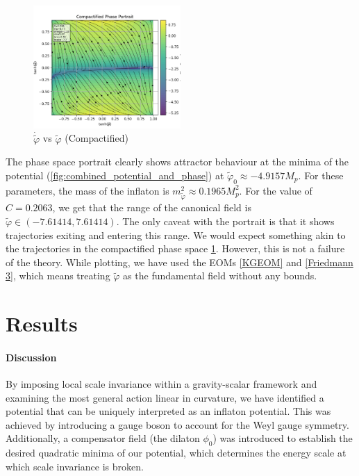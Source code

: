 \documentclass[aps,prd,reprint,preprintnumbers,showpacs,floatfix,nofootinbib,superscript address]{revtex4-2}
\begin{document}
\begin{figure}
    \includegraphics[width=0.5\textwidth]{Python/results/phase_compact.png}
    \caption{$\dot{\tilde{\varphi}}$ vs $\tilde{\varphi}$ (Compactified)}
    \label{Optimized Compact Phase Space potrait1}
\end{figure}


The phase space portrait clearly shows attractor behaviour at the minima of the potential (\cref{fig:combined_potential_and_phase}) at $\tilde{\varphi}_0 \approx -4.9157 M_p$. For these parameters, the mass of the inflaton is $m_{\tilde{\varphi}}^2 \approx  0.1965 M_p^2$. For the value of $C = 0.2063$, we get that the range of the canonical field is $\tilde{\varphi} \in (-7.61414,7.61414)$. The only caveat with the portrait is that it shows trajectories exiting and entering this range. We would expect something akin to the trajectories in the compactified phase space \cref{Optimized Compact Phase Space potrait1}. However, this is not a failure of the theory. While plotting, we have used the EOMs \cref{KGEOM} and \cref{Friedmann 3}, which means treating $\tilde{\varphi}$ as the fundamental field without any bounds.

\section{Results}
\paragraph*{Discussion}
 By imposing local scale invariance within a gravity-scalar framework and examining the most general action linear in curvature, we have identified a potential that can be uniquely interpreted as an inflaton potential. This was achieved by introducing a gauge boson to account for the Weyl gauge symmetry. Additionally, a compensator field (the dilaton $\phi_0$) was introduced to establish the desired quadratic minima of our potential, which determines the energy scale at which scale invariance is broken. 
 
\end{document}
